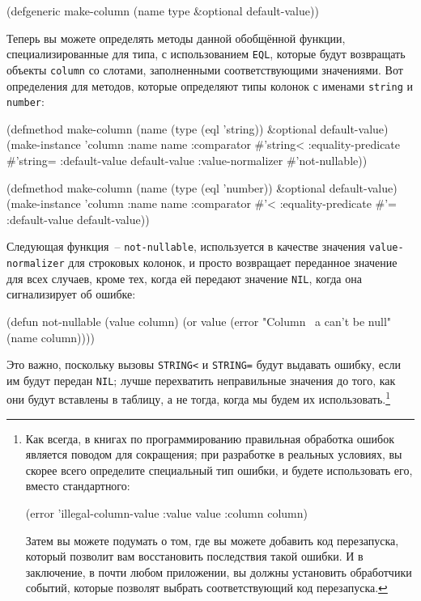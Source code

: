 \begin{myverb}
(defgeneric make-column (name type &optional default-value))
\end{myverb}

Теперь вы можете определять методы данной обобщённой функции, специализированные для типа,
с использованием \lstinline{EQL}, которые будут возвращать объекты \lstinline{column} со слотами,
заполненными соответствующими значениями.  Вот определения для методов, которые определяют
типы колонок с именами \lstinline{string} и \lstinline{number}:

\begin{myverb}
(defmethod make-column (name (type (eql 'string)) &optional default-value)
  (make-instance
   'column 
   :name name
   :comparator #'string< 
   :equality-predicate #'string=
   :default-value default-value
   :value-normalizer #'not-nullable))

(defmethod make-column (name (type (eql 'number)) &optional default-value)
  (make-instance 
   'column
   :name name
   :comparator #'< 
   :equality-predicate #'=
   :default-value default-value))
\end{myverb}

Следующая функция~-- \lstinline{not-nullable}, используется в качестве значения
\lstinline{value-normalizer} для строковых колонок, и просто возвращает переданное значение для
всех случаев, кроме тех, когда ей передают значение \lstinline{NIL}, когда она сигнализирует об
ошибке:

\begin{myverb}
(defun not-nullable (value column)
  (or value (error "Column ~a can't be null" (name column))))
\end{myverb}

Это важно, поскольку вызовы \lstinline{STRING<} и \lstinline{STRING=} будут выдавать ошибку, если им
будут передан \lstinline{NIL}; лучше перехватить неправильные значения до того, как они будут
вставлены в таблицу, а не тогда, когда мы будем их использовать.\footnote{Как всегда, в
  книгах по программированию правильная обработка ошибок является поводом для сокращения;
  при разработке в реальных условиях, вы скорее всего определите специальный тип ошибки, и
  будете использовать его, вместо стандартного:

\begin{myverb}
(error 'illegal-column-value :value value :column column)
\end{myverb}

Затем вы можете подумать о том, где вы можете добавить код перезапуска, который позволит
вам восстановить последствия такой ошибки.  И в заключение, в почти любом приложении, вы
должны установить обработчики событий, которые позволят выбрать соответствующий код
перезапуска.}

